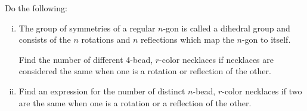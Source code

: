 \documentclass[12pt]{memoir}
\begin{document}
\begin{Ej}[6.8 Sagan]
    Do the following:
    \begin{enumerate}[i)]
        \itemsep=-0.4em
        \item  The group of symmetries of a regular $n$-gon is called a dihedral group and
        consists of the $n$ rotations and $n$ reflections which map the $n$-gon to itself.\par 
        Find the number of different 4-bead, $r$-color necklaces if necklaces are considered the same when one is a rotation or reflection of the other.
        \item Find an expression for the number of distinct $n$-bead, $r$-color necklaces if two
        are the same when one is a rotation or a reflection of the other.        
    \end{enumerate}
\end{Ej}
\end{document}
